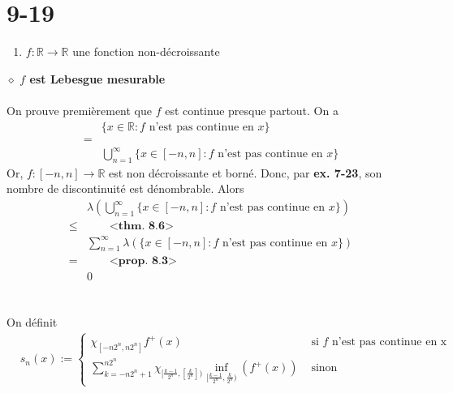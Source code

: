 \documentclass[a4paper,10pt]{article}
\begin{document}
\section*{9-19}
\begin{enumerate}
	\item $f : \mathbb{R} \rightarrow \mathbb{R}$ une fonction non-décroissante
\end{enumerate}
$\diamond$ \textbf{$f$ est Lebesgue mesurable}
\\
\\
On prouve premièrement que $f$ est continue presque partout. On a 
\begin{align*}
	& \{x \in \mathbb{R} : f \text{ n'est pas continue en } x\} \\
	= \\
	& \bigcup_{n=1}^\infty \{x \in [-n, n] : f \text{ n'est pas continue en } x\}
\end{align*}
Or, $f: [-n, n] \rightarrow \mathbb{R}$ est non décroissante et borné. Donc, par \textbf{ex. 7-23}, son nombre de discontinuité est dénombrable. Alors
\begin{align*}
	& \lambda \left ( \bigcup_{n=1}^\infty \{x \in [-n,n] : f \text{ n'est pas continue en } x \} \right) \\
	\leq & \qquad \textbf{<thm. 8.6>} \\
	& \sum_{n=1}^\infty \lambda ( \{x \in [-n,n] : f \text{ n'est pas continue en } x\} ) \\
	= & \qquad \textbf{<prop. 8.3>} \\
	& 0
\end{align*}
\\
\\
On définit
\begin{align*}
	& s_n(x) := 
	\begin{cases}
		\chi_{[-n2^n, n2^n]}f^+(x) & \text{ si } f \text{ n'est pas continue en x } \\
		\sum_{k = -n2^n + 1}^{n2^n} \chi_{[\frac{k-1}{2^n}, [\frac{k}{2^n}])} \inf_{[\frac{k-1}{2^n}, \frac{k}{2^n})} (f^+(x)) & \text{ sinon}
	\end{cases}		
\end{align*}
\end{document}
